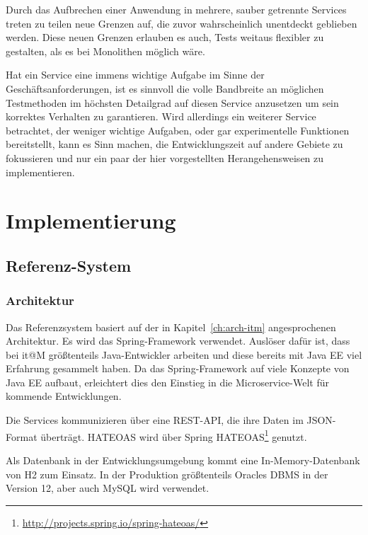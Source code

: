 \documentclass[12pt,a4paper,bibliography=totocnumbered,listof=totocnumbered]{scrartcl}
\begin{document}
Durch das Aufbrechen einer Anwendung in mehrere, sauber getrennte Services treten zu teilen neue Grenzen auf, die zuvor wahrscheinlich unentdeckt geblieben werden. Diese neuen Grenzen erlauben es auch, Tests weitaus flexibler zu gestalten, als es bei Monolithen möglich wäre.

Hat ein Service eine immens wichtige Aufgabe im Sinne der Geschäftsanforderungen, ist es sinnvoll die volle Bandbreite an möglichen Testmethoden im höchsten Detailgrad auf diesen Service anzusetzen um sein korrektes Verhalten zu garantieren. Wird allerdings ein weiterer Service betrachtet, der weniger wichtige Aufgaben, oder gar experimentelle Funktionen bereitstellt, kann es Sinn machen, die Entwicklungszeit auf andere Gebiete zu fokussieren und nur ein paar der hier vorgestellten Herangehensweisen zu implementieren.\cite{clemson}

\section{Implementierung}\label{ch:implementierung}

\subsection{Referenz-System}

\subsubsection{Architektur}

Das Referenzsystem basiert auf der in Kapitel~\ref{ch:arch-itm} angesprochenen Architektur. Es wird das Spring-Framework verwendet. Auslöser dafür ist, dass bei it@M größtenteils Java-Entwickler arbeiten und diese bereits mit Java EE viel Erfahrung gesammelt haben. Da das Spring-Framework auf viele Konzepte von Java EE aufbaut, erleichtert dies den Einstieg in die Microservice-Welt für kommende Entwicklungen.

Die Services kommunizieren über eine REST-\ac{API}, die ihre Daten im JSON-Format überträgt. \ac{HATEOAS} wird über Spring \ac{HATEOAS}\footnote{\url{http://projects.spring.io/spring-hateoas/}} genutzt.

Als Datenbank in der Entwicklungsumgebung kommt eine In-Memory-Datenbank von H2 zum Einsatz. In der Produktion größtenteils Oracles DBMS in der Version 12, aber auch MySQL wird verwendet.
\end{document}
